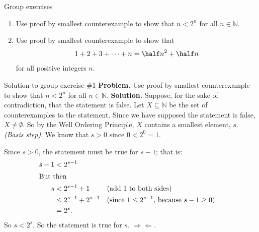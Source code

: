 \documentclass[10pt]{beamer}
\newcommand{\leastElement}{s}
\begin{document}
\begin{frame}{Group exercises}
\begin{enumerate}
	\item Use proof by smallest counterexample to show that $n < 2^n$ for all $n \in \mathbb{N}$.  
	\item Use proof by smallest counterexample to show that 
	\[ 1+2+3+ \cdots + n = \half n^2 + \half n\]
	for all positive integers $n$.
\end{enumerate}

\end{frame}



\begin{frame}{Solution to group exercise \#1}
\small 
\colorbox{red!30}{\textbf{Problem.}}  Use proof by smallest counterexample to show that $n < 2^n$ for all $n \in \mathbb{N}$.
\vfill 
\colorbox{green!30}{\textbf{Solution.}}  Suppose, for the sake of contradiction, that the statement is false.  Let $X \subseteq \mathbb{N}$ be the set of counterexamples to the statement.   Since we have supposed the statement is false, $X \neq \emptyset$.  So by the Well Ordering Principle, $X$ contains a smallest element, $\leastElement$.  \\
\vspace{.25cm}
\textit{(Basis step)}. We know that $\leastElement> 0$ since $0 < 2^0 = 1$. 

Since $\leastElement>0$, the statement must be true for $\leastElement-1$; that is:
%
\begin{align*}
\leastElement-1 &< 2^{\leastElement-1} \\
\intertext{But then} 
\leastElement &< 2^{\leastElement-1} + 1 && \text{(add 1 to both sides)} \\
&\leq 2^{\leastElement-1} + 2^{\leastElement-1} && \text{(since } 1 \leq 2^{\leastElement-1} \text{, because } \leastElement - 1 \geq 0) \\
&= 2^{\leastElement}.
\end{align*}
%
So $s < 2^s$. So the statement is true for $\leastElement$. \; $\Rightarrow\Leftarrow$.
\end{frame}
\end{document}
